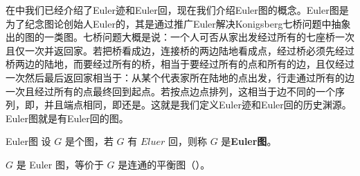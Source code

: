 
\cite{graph2}在中我们已经介绍了Euler迹和Euler回，现在我们介绍Euler图的概念。Euler图是为了纪念图论创始人Euler的，其是通过推广Euler解决Konigsberg七桥问题中抽象出的图的一类图。七桥问题大概是说：一个人可否从家出发经过所有的七座桥一次且仅一次并返回家。若把桥看成边，连接桥的两边陆地看成点，经过桥必须先经过桥两边的陆地，而要经过所有的桥，相当于要经过所有的点和所有的边，且仅经过一次然后最后返回家相当于：从某个代表家所在陆地的点出发，行走通过所有的边一次且经过所有的点最终回到起点。若按点边点排列，这相当于边不同的一个序列，即，并且端点相同，即还是。这就是我们定义Euler迹和Euler回的历史渊源。Euler图就是有Euler回的图。

\begin{definition}{Euler图}
设 $G$ 是个图，若 $G$ 有 $Eluer$ 回，则称 $G$ 是\textbf{Euler图}。
\end{definition}



\begin{theorem}{}
$G$ 是 Euler 图，等价于 $G$ 是连通的平衡图（）。
\end{theorem}








